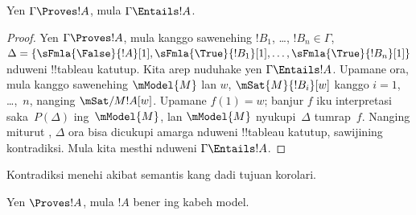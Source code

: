 \documentclass[../../../include/open-logic-section]{subfiles}
\begin{document}
\begin{cor}
Yen $\Gamma \Proves !A$, mula $\Gamma \Entails !A$.
\end{cor}

\begin{proof}
  Yen $\Gamma \Proves !A$, mula kanggo sawenehing $!B_1$, \dots,
  $!B_n \in \Gamma$, $\Delta = \{\sFmla{\False}{!A}[1], \sFmla{\True}{!B_1}[1],
  \dots, \sFmla{\True}{!B_n}[1]\}$ nduweni !!{tableau} katutup.
  Kita arep nuduhake yen $\Gamma \Entails !A$. Upamane ora,
  mula kanggo sawenehing $\mModel{M}$ lan $w$,
  $\mSat{M}{!B_i}[w]$ kanggo $i=1$, \dots,~$n$, nanging
  $\mSat/{M}{!A}[w]$. Upamane $f(1) = w$; banjur $f$ iku
  interpretasi saka~$P(\Delta)$ ing~$\mModel{M}$, lan $\mModel{M}$
  nyukupi~$\Delta$ tumrap~$f$. Nanging miturut
  , $\Delta$ ora bisa dicukupi amarga
  nduweni !!{tableau} katutup, sawijining kontradiksi. Mula kita
  mesthi nduweni $\Gamma \Entails !A$.
\end{proof}
Kontradiksi menehi akibat semantis kang dadi tujuan korolari.

\begin{cor}
Yen $\Proves !A$, mula $!A$ bener ing kabeh model.
\end{cor}
\end{document}
